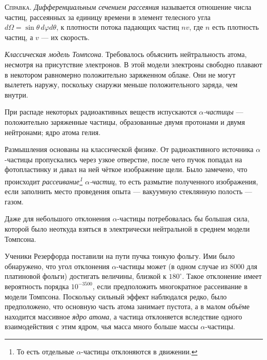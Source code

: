 {\footnotesize
  \textsc{Справка.} \emph{Дифференциальным сечением рассеяния} называется
  отношение числа частиц, рассеянных за единицу времени в элемент телесного угла
  $ d\Omega = \sin\theta\,d\varphi d\theta $, к плотности потока падающих частиц
  $ nv $, где $ n $ есть плотность частиц, а $ v $ --- их скорость. 

  \emph{Классическая модель Томпсона}. Требовалось объяснить нейтральность атома,
  несмотря на присутствие электронов. В этой модели электроны свободно плавают в некотором
  равномерно положительно заряженном облаке. Они не могут вылететь наружу, поскольку
  снаружи меньше положительного заряда, чем внутри.

  При распаде некоторых радиоактивных веществ испускаются \emph{$ \alpha
  $-частицы} --- положительно заряженные частицы, образованные двумя протонами и
  двумя нейтронами; ядро атома гелия.
}



Размышления основаны на классической физике. От радиоактивного источника $ \alpha $-частицы пропускались через узкое
отверстие, после чего пучок попадал на фотопластинку и давал на ней чёткое
изображение щели. Было замечено, что происходит \emph{рассеивание\footnote{То
  есть отдельные $ \alpha $-частицы отклоняются в движении.} $ \alpha
$-частиц}, то есть размытие полученного изображения, если заполнить место
проведения опыта --- вакуумную стеклянную полость --- газом. 

Даже для небольшого отклонения $ \alpha $-частицы потребовалась бы большая сила,
которой было неоткуда взяться в электрически нейтральной в среднем модели
Томпсона. 

Ученики Резерфорда поставили на пути пучка тонкую фольгу. Ими было обнаружено,
что угол отклонения $ \alpha $-частицы может (в одном случае из 8000 для
платиновой фольги) достигать величины,
близкой к $ 180^\circ $. Такое отклонение имеет вероятность
порядка $ 10^{-3500} $, если предположить многократное рассеивание в модели
Томпсона. Поскольку сильный эффект наблюдался редко, было предположено, что основную часть атома занимает пустота, а в
малом объёме находится массивное \emph{ядро атома}, а частица отклоняется
вследствие одного взаимодействия с этим ядром, чья масса много больше массы
$ \alpha $-частицы.

